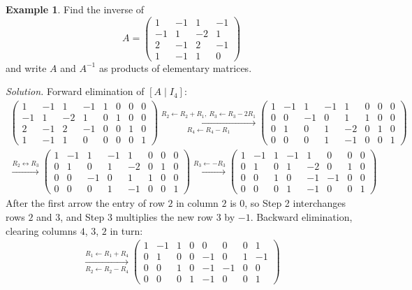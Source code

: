 \documentclass[12pt]{article}
\theoremstyle{definition}
\newtheorem{example}[theorem]{Example}
\begin{document}
\begin{example}\label{r2-exm-inverse-gj}
Find the inverse of
\[
A=\begin{pmatrix}1&-1&1&-1\\-1&1&-2&1\\2&-1&2&-1\\1&-1&1&0\end{pmatrix}
\]
and write \(A\) and \(A^{-1}\) as products of elementary matrices.

\textit{Solution.} Forward elimination of \([A\mid I_4]\):
\[
\begin{gathered}
\left(\begin{array}{cccc|cccc}1&-1&1&-1&1&0&0&0\\-1&1&-2&1&0&1&0&0\\2&-1&2&-1&0&0&1&0\\1&-1&1&0&0&0&0&1\end{array}\right)
\xrightarrow[R_4\leftarrow R_4-R_1]{R_2\leftarrow R_2+R_1,\ R_3\leftarrow R_3-2R_1}
\left(\begin{array}{cccc|cccc}1&-1&1&-1&1&0&0&0\\0&0&-1&0&1&1&0&0\\0&1&0&1&-2&0&1&0\\0&0&0&1&-1&0&0&1\end{array}\right)
\\
\xrightarrow{R_2\leftrightarrow R_3}
\left(\begin{array}{cccc|cccc}1&-1&1&-1&1&0&0&0\\0&1&0&1&-2&0&1&0\\0&0&-1&0&1&1&0&0\\0&0&0&1&-1&0&0&1\end{array}\right)
\xrightarrow{R_3\leftarrow-R_3}
\left(\begin{array}{cccc|cccc}1&-1&1&-1&1&0&0&0\\0&1&0&1&-2&0&1&0\\0&0&1&0&-1&-1&0&0\\0&0&0&1&-1&0&0&1\end{array}\right)
\end{gathered}
\]
After the first arrow the entry of row \(2\) in column \(2\) is \(0\), so Step 2 interchanges
rows \(2\) and \(3\), and Step 3 multiplies the new row \(3\) by \(-1\). Backward elimination,
clearing columns \(4\), \(3\), \(2\) in turn:
\[
\begin{gathered}
\xrightarrow[R_2\leftarrow R_2-R_4]{R_1\leftarrow R_1+R_4}
\left(\begin{array}{cccc|cccc}1&-1&1&0&0&0&0&1\\0&1&0&0&-1&0&1&-1\\0&0&1&0&-1&-1&0&0\\0&0&0&1&-1&0&0&1\end{array}\right)

\end{gathered}\]
\end{example}
\end{document}
